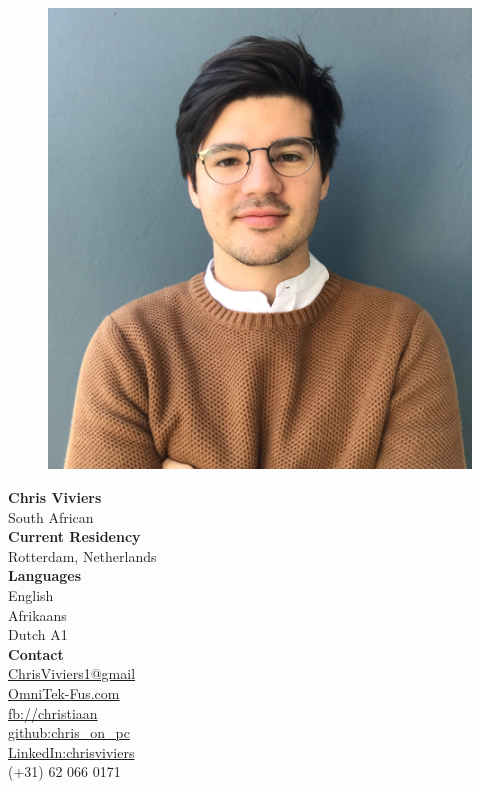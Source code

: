 \documentclass[a4paper,12pt,final]{memoir}
\newcommand{\CVItem}[1]
	{\textbf{\color{RoyalBlue} #1}}
\begin{document}
\begin{figure}
	\hfill
	\includegraphics[width=0.7\columnwidth ]{picture}
	\vspace{-5cm}
\end{figure}


\begin{flushright}\small
	
	\CVItem{Chris Viviers}\\
	South African\\
	\vspace{0.5cm}	
	\CVItem{Current Residency}\\
	Rotterdam, Netherlands\\
	\vspace{0.5cm}
	\CVItem{Languages}\\
	English \\
	Afrikaans\\
	Dutch A1 \\
	\vspace{0.5cm}	
	\CVItem{Contact}\\	
	\href{mailto:ChrisViviers1@gmail.com}{ChrisViviers1@gmail}\\
	\href{http://www.omnitek-fus.com}{OmniTek-Fus.com}\\
	\href{https://www.facebook.com/christiaan.viviers.1}{fb://christiaan}\\
	\href{https://github.com/Chris-On-PC}{github:chris\_on\_pc}\\
	\href{https://www.linkedin.com/in/chrisviviers}{LinkedIn:chrisviviers}\\
	(+31) 62 066 0171
	
	
\end{flushright}\normalsize
\end{document}

